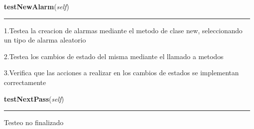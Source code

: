     \label{GroundSegment:tests:Test:testNewAlarm}

    \vspace{0.5ex}

\hspace{.8\funcindent}\begin{boxedminipage}{\funcwidth}

    \raggedright \textbf{testNewAlarm}(\textit{self})

    \vspace{-1.5ex}

    \rule{\textwidth}{0.5\fboxrule}
\setlength{\parskip}{2ex}
    1.Testea la creacion de alarmas mediante el metodo de clase new, 
    seleccionando un tipo de alarma aleatorio

    2.Testea los cambios de estado del misma mediante el llamado a metodos

    3.Verifica que las acciones a realizar en los cambios de estados se 
    implementan correctamente

\setlength{\parskip}{1ex}
    \end{boxedminipage}

    \label{GroundSegment:tests:Test:testNextPass}

    \vspace{0.5ex}

\hspace{.8\funcindent}\begin{boxedminipage}{\funcwidth}

    \raggedright \textbf{testNextPass}(\textit{self})

    \vspace{-1.5ex}

    \rule{\textwidth}{0.5\fboxrule}
\setlength{\parskip}{2ex}
    Testeo no finalizado

\setlength{\parskip}{1ex}
    \end{boxedminipage}

